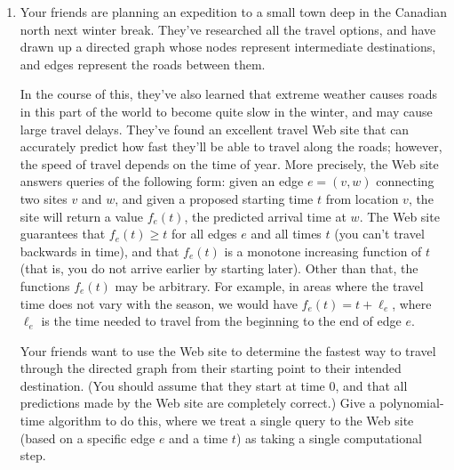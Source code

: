 \documentclass[12pt]{article}
\begin{document}
\begin{enumerate}
{}


\item

Your friends are planning an expedition to a small town
deep in the Canadian north next winter break.
They've researched all the travel options, and have
drawn up a directed graph whose nodes represent intermediate
destinations, and edges represent the roads between them.

In the course of this, they've also learned that extreme weather
causes roads in this part
of the world to become quite slow in the winter,
and may cause large travel delays.
They've found an excellent travel Web site that can accurately
predict how fast they'll be able to travel along the roads;
however, the speed of travel depends on the time of year.
More precisely, the Web site answers queries of the following form:
given an edge $e = (v,w)$ connecting two sites $v$ and $w$,
and given a proposed starting time $t$ from location $v$,
the site will return a value $f_e(t)$, the predicted arrival time at $w$.
The Web site guarantees that $f_e(t) \ge t$ for all edges $e$ and all
times $t$ (you can't travel backwards in time), and that
$f_e(t)$ is a monotone increasing function of $t$
(that is, you do not arrive earlier by starting later).
Other than that, the functions $f_e(t)$ may be arbitrary.
For example, in areas where the travel time does not vary with the
season, we would have $f_e(t)=t+\ell_e$, where $\ell_e$ is the time needed
to travel from the beginning to the end of edge $e$.

Your friends want to use the Web site to determine the fastest
way to travel through the directed graph
from their starting point to their intended destination.
(You should assume that they start at time $0$, and that all
predictions made by the Web site are completely correct.)
Give a polynomial-time algorithm to do this, where we treat
a single query to the Web site (based on a specific edge $e$ and a time $t$)
as taking a single computational step.

\end{enumerate}
\end{document}
